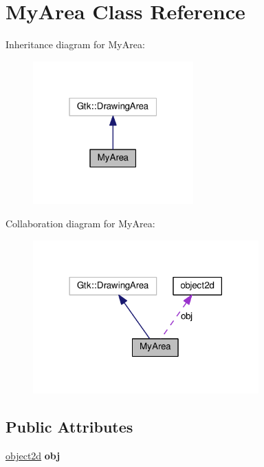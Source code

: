 \hypertarget{classMyArea}{}\section{My\+Area Class Reference}
\label{classMyArea}


Inheritance diagram for My\+Area\+:
\nopagebreak
\begin{figure}[H]
\begin{center}
\leavevmode
\includegraphics[width=175pt]{classMyArea__inherit__graph}
\end{center}
\end{figure}


Collaboration diagram for My\+Area\+:
\nopagebreak
\begin{figure}[H]
\begin{center}
\leavevmode
\includegraphics[width=246pt]{classMyArea__coll__graph}
\end{center}
\end{figure}
\subsection*{Public Attributes}
\begin{DoxyCompactItemize}
\item 
\hyperlink{classobject2d}{object2d} {\bfseries obj}\hypertarget{classMyArea_a08782571af573f253062bfc3e63e8567}{}\label{classMyArea_a08782571af573f253062bfc3e63e8567}

\end{DoxyCompactItemize}
